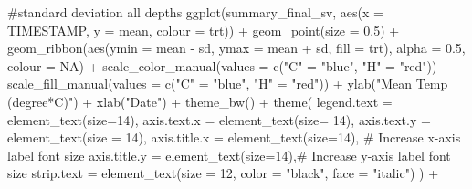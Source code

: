 \documentclass[
  letterpaper,
  DIV=11,
  numbers=noendperiod]{scrartcl}
\newenvironment{Shaded}{\begin{snugshade}}{\end{snugshade}}
\newcommand{\AttributeTok}[1]{\textcolor[rgb]{0.40,0.45,0.13}{#1}}
\newcommand{\CommentTok}[1]{\textcolor[rgb]{0.37,0.37,0.37}{#1}}
\newcommand{\ConstantTok}[1]{\textcolor[rgb]{0.56,0.35,0.01}{#1}}
\newcommand{\DecValTok}[1]{\textcolor[rgb]{0.68,0.00,0.00}{#1}}
\newcommand{\FloatTok}[1]{\textcolor[rgb]{0.68,0.00,0.00}{#1}}
\newcommand{\FunctionTok}[1]{\textcolor[rgb]{0.28,0.35,0.67}{#1}}
\newcommand{\NormalTok}[1]{\textcolor[rgb]{0.00,0.23,0.31}{#1}}
\newcommand{\OtherTok}[1]{\textcolor[rgb]{0.00,0.23,0.31}{#1}}
\newcommand{\SpecialCharTok}[1]{\textcolor[rgb]{0.37,0.37,0.37}{#1}}
\newcommand{\StringTok}[1]{\textcolor[rgb]{0.13,0.47,0.30}{#1}}
\begin{document}
\begin{Shaded}
\begin{Highlighting}[]
\CommentTok{\#standard deviation all depths}
\FunctionTok{ggplot}\NormalTok{(summary\_final\_sv, }\FunctionTok{aes}\NormalTok{(}\AttributeTok{x =}\NormalTok{ TIMESTAMP, }\AttributeTok{y =}\NormalTok{ mean, }\AttributeTok{colour =}\NormalTok{ trt)) }\SpecialCharTok{+}
  \FunctionTok{geom\_point}\NormalTok{(}\AttributeTok{size =} \FloatTok{0.5}\NormalTok{) }\SpecialCharTok{+}
  \FunctionTok{geom\_ribbon}\NormalTok{(}\FunctionTok{aes}\NormalTok{(}\AttributeTok{ymin =}\NormalTok{ mean }\SpecialCharTok{{-}}\NormalTok{ sd, }\AttributeTok{ymax =}\NormalTok{ mean }\SpecialCharTok{+}\NormalTok{ sd, }\AttributeTok{fill =}\NormalTok{ trt), }\AttributeTok{alpha =} \FloatTok{0.5}\NormalTok{, }\AttributeTok{colour =} \ConstantTok{NA}\NormalTok{) }\SpecialCharTok{+}
  \FunctionTok{scale\_color\_manual}\NormalTok{(}\AttributeTok{values =} \FunctionTok{c}\NormalTok{(}\StringTok{"C"} \OtherTok{=} \StringTok{"blue"}\NormalTok{, }\StringTok{"H"} \OtherTok{=} \StringTok{"red"}\NormalTok{)) }\SpecialCharTok{+}
  \FunctionTok{scale\_fill\_manual}\NormalTok{(}\AttributeTok{values =} \FunctionTok{c}\NormalTok{(}\StringTok{"C"} \OtherTok{=} \StringTok{"blue"}\NormalTok{, }\StringTok{"H"} \OtherTok{=} \StringTok{"red"}\NormalTok{)) }\SpecialCharTok{+}
  \FunctionTok{ylab}\NormalTok{(}\StringTok{"Mean Temp (degree*C)"}\NormalTok{) }\SpecialCharTok{+}
  \FunctionTok{xlab}\NormalTok{(}\StringTok{"Date"}\NormalTok{) }\SpecialCharTok{+}
  \FunctionTok{theme\_bw}\NormalTok{() }\SpecialCharTok{+}
  \FunctionTok{theme}\NormalTok{(}
    \AttributeTok{legend.text =} \FunctionTok{element\_text}\NormalTok{(}\AttributeTok{size=}\DecValTok{14}\NormalTok{),}
    \AttributeTok{axis.text.x =} \FunctionTok{element\_text}\NormalTok{(}\AttributeTok{size=} \DecValTok{14}\NormalTok{),}
    \AttributeTok{axis.text.y =} \FunctionTok{element\_text}\NormalTok{(}\AttributeTok{size =} \DecValTok{14}\NormalTok{),}
    \AttributeTok{axis.title.x =} \FunctionTok{element\_text}\NormalTok{(}\AttributeTok{size=}\DecValTok{14}\NormalTok{),  }\CommentTok{\# Increase x{-}axis label font size}
    \AttributeTok{axis.title.y =} \FunctionTok{element\_text}\NormalTok{(}\AttributeTok{size=}\DecValTok{14}\NormalTok{),}\CommentTok{\# Increase y{-}axis label font size}
    \AttributeTok{strip.text =} \FunctionTok{element\_text}\NormalTok{(}\AttributeTok{size =} \DecValTok{12}\NormalTok{, }\AttributeTok{color =} \StringTok{"black"}\NormalTok{, }\AttributeTok{face =} \StringTok{"italic"}\NormalTok{)}
\NormalTok{  ) }\SpecialCharTok{+}

\end{Highlighting}
\end{Shaded}
\end{document}
